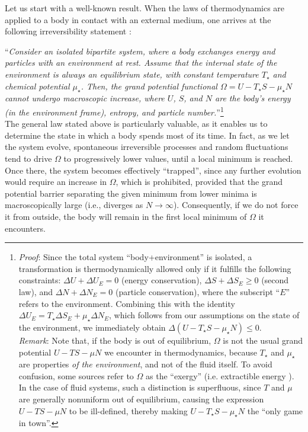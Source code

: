 \documentclass[a4paper, amsfonts, amssymb, amsmath, reprint, showkeys, nofootinbib, twoside,notitlepage,onecolumn]{revtex4-2}
\theoremstyle{definition}
\theoremstyle{theorem}
\theoremstyle{corollary}
\begin{document}
Let us start with a well-known result. When the laws of thermodynamics are applied to a body in contact with an external medium, one arrives at the following irreversibility statement \cite[\S 20]{landau5}:

\noindent ``\textit{Consider an isolated bipartite system, where a body exchanges energy and particles with an environment at rest. Assume that the internal state of the environment is always an equilibrium state, with constant temperature $T_\star$ and chemical potential $\mu_\star$. Then, the grand potential functional $\Omega=U-T_\star S-\mu_\star N$ cannot undergo macroscopic increase, where $U$, $S$, and $N$ are the body's energy (in the environment frame), entropy, and particle number.}''\footnote{\label{foononanan1ona}\textit{Proof}: Since the total system ``body+environment'' is isolated, a transformation is thermodynamically allowed only if it fulfills the following constraints: $\Delta U+\Delta U_E=0$ (energy conservation), $\Delta S+\Delta S_E\geq 0$ (second law), and $\Delta N+\Delta N_E=0$ (particle conservation), where the subscript ``$E$'' refers to the environment. Combining this with the identity $\Delta U_E=T_\star \Delta S_E+\mu_\star \Delta N_E$, which follows from our assumptions on the state of the environment, we immediately obtain $\Delta(U-T_\star S-\mu_\star N)\leq 0$.\\
\textit{Remark}: Note that, if the body is out of equilibrium, $\Omega$ is not the usual grand potential $U-TS-\mu N$ we encounter in thermodynamics, because $T_\star$ and $\mu_\star$ are properties \textit{of the environment}, and not of the fluid itself. To avoid confusion, some sources refer to $\Omega$ as the ``exergy'' (i.e. extractible energy \cite{BecattiniExergy2023}). In the case of fluid systems, such a distinction is superfluous, since $T$ and $\mu$ are generally nonuniform out of equilibrium, causing the expression $U - T S - \mu N$ to be ill-defined, thereby making $U-T_\star S-\mu_\star N$ the ``only game in town''.}\\
The general law stated above is particularly valuable, as it enables us to determine the state in which a body spends most of its time. In fact, as we let the system evolve, spontaneous irreversible processes and random fluctuations tend to drive $\Omega$ to progressively lower values, until a local minimum is reached. Once there, the system becomes effectively ``trapped'', since any further evolution would require an increase in $\Omega$, which is prohibited, provided that the grand potential barrier separating the given minimum from lower minima is macroscopically large (i.e., diverges as $N \to \infty$). Consequently, if we do not force it from outside, the body will remain in the first local minimum of $\Omega$ it encounters.
\end{document}
